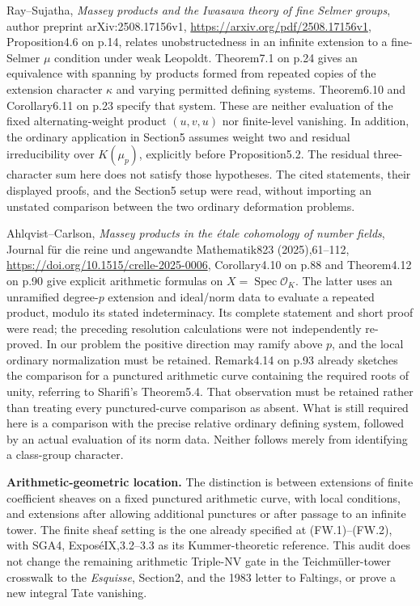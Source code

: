 \documentclass[11pt,a4paper]{article}
\theoremstyle{definition}
\renewcommand{\paragraph}[1]{\par\smallskip\noindent\textbf{#1}\quad\ignorespaces}
\begin{document}
Ray--Sujatha, \emph{Massey products and the Iwasawa theory of fine
Selmer groups}, author preprint arXiv:2508.17156v1,
\url{https://arxiv.org/pdf/2508.17156v1}, Proposition4.6 on p.14,
relates unobstructedness in an infinite extension to a fine-Selmer
$\mu$ condition under weak Leopoldt. Theorem7.1 on p.24 gives an
equivalence with spanning by products formed from repeated copies
of the extension character $\kappa$ and varying permitted defining
systems. Theorem6.10 and Corollary6.11 on p.23 specify that system.
These are neither evaluation of the fixed alternating-weight
product $(u,v,u)$ nor finite-level vanishing. In addition, the
ordinary application in Section5 assumes weight two and residual
irreducibility over $K(\mu_p)$, explicitly before Proposition5.2.
The residual three-character sum here does not satisfy those
hypotheses. The cited statements, their displayed proofs, and the
Section5 setup were read, without importing an unstated comparison
between the two ordinary deformation problems.

Ahlqvist--Carlson, \emph{Massey products in the \'etale cohomology
of number fields}, Journal f\"ur die reine und angewandte
Mathematik823 (2025),61--112,
\url{https://doi.org/10.1515/crelle-2025-0006},
Corollary4.10 on p.88 and Theorem4.12 on p.90 give explicit
arithmetic formulas on $X=\operatorname{Spec}\mathcal O_K$.
The latter uses an unramified degree-$p$ extension and ideal/norm
data to evaluate a repeated product, modulo its stated
indeterminacy. Its complete statement and short proof were read;
the preceding resolution calculations were not independently
re-proved. In our problem the positive direction may ramify
above $p$, and the local ordinary normalization must be retained.
Remark4.14 on p.93 already sketches the comparison for a punctured
arithmetic curve containing the required roots of unity, referring
to Sharifi's Theorem5.4. That observation must be retained rather
than treating every punctured-curve comparison as absent.
What is still required here is a comparison with the precise
relative ordinary defining system, followed by an actual evaluation
of its norm data. Neither follows merely from identifying a
class-group character.

\paragraph{Arithmetic-geometric location.}
The distinction is between extensions of finite coefficient
sheaves on a fixed punctured arithmetic curve, with local
conditions, and extensions after allowing additional punctures
or after passage to an infinite tower. The finite sheaf setting
is the one already specified at (FW.1)--(FW.2), with SGA4,
Expos\'eIX,3.2--3.3 as its Kummer-theoretic reference. This audit
does not change the remaining arithmetic Triple-NV gate in the
Teichm\"uller-tower crosswalk to the \emph{Esquisse}, Section2,
and the 1983 letter to Faltings, or prove a new integral Tate vanishing.
\end{document}
